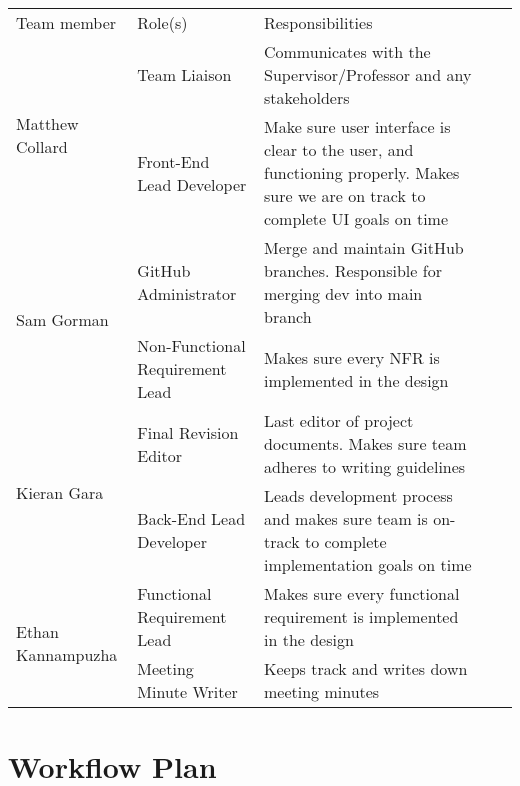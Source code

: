 \documentclass{article}
\begin{document}
\begin{table}[h]
\centering
\begin{tabular}{|p{1.3in}|p{2in}|p{2.6in}|ll}
\cline{1-3}
Team member& Role(s)& Responsibilities &  &  \\ \cline{1-3}
\multirow{2}{*}{Matthew Collard}   & Team Liaison & Communicates with the Supervisor/Professor and any stakeholders &  &  \\ \cline{2-3} & Front-End Lead Developer & Make sure user interface is clear to the user, and functioning properly. Makes sure we are on track to complete UI goals on time &  &  \\ \cline{1-3}
\multirow{2}{*}{Sam Gorman} & GitHub Administrator & Merge and maintain GitHub branches. Responsible for merging dev into main branch  &  &  \\ \cline{2-3} & Non-Functional Requirement Lead & Makes sure every NFR is implemented in the design &  &  \\ \cline{1-3}
\multirow{2}{*}{Kieran Gara}  & Final Revision Editor  & Last editor of project documents. Makes sure team adheres to writing guidelines   &  &  \\ \cline{2-3}& Back-End Lead Developer  & Leads development process and makes sure team is on-track to complete implementation goals on time  &  &  \\ \cline{1-3}
\multirow{2}{*}{Ethan Kannampuzha} & Functional Requirement Lead     & Makes sure every functional requirement is implemented in the design &  &  \\ \cline{2-3} & Meeting Minute Writer & Keeps track and writes down meeting minutes &  &  \\ \cline{1-3}
\end{tabular}
\end{table}



\section{Workflow Plan}
\end{document}
